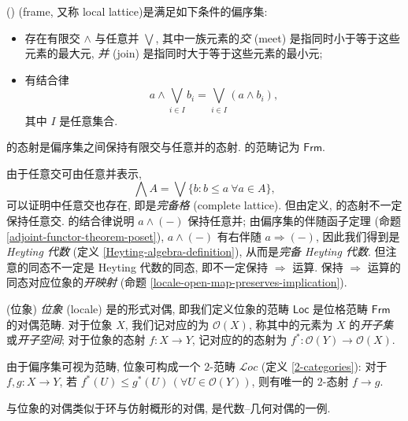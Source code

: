 \begin{definition}
	[label={frame-definition}]
	{(\fm{})}
	\emph{\fm{}} (frame, 又称 local lattice)\footnotemark 是满足如下条件的偏序集:
	\begin{itemize}
		\item 存在有限交 $\wedge$ 与任意并 $\bigvee$, 其中一族元素的\emph{交} (meet) 是指同时小于等于这些元素的最大元, \emph{并} (join) 是指同时大于等于这些元素的最小元;
		\item 有结合律
		$$
		a \wedge \bigvee_{i \in I} b_i = \bigvee_{i \in I} (a \wedge b_i),
		$$
		其中 $I$ 是任意集合.
	\end{itemize}
	
	\fm{}的态射是偏序集之间保持有限交与任意并的态射. \fm{}的范畴记为 $\mathsf {Frm}$.
\end{definition}
\begin{remark}
	[label={arbitrary-meet}]
	{}
	由于任意交可由任意并表示,
	$$
	\bigwedge A = \bigvee \big\{ b \colon b\leq a \ \forall a\in A\big\},
	$$
	可以证明\fm{}中任意交也存在, 即\fm{}是\emph{完备格} (complete lattice). 但由定义, \fm{}的态射不一定保持任意交.
	\fm{}的结合律说明 $a\wedge({-})$ 保持任意并; 由偏序集的伴随函子定理 (命题 \ref{adjoint-functor-theorem-poset}),
	$a\wedge({-})$ 有右伴随 $a\Rightarrow ({-})$, 因此我们得到\fm{}是\emph{Heyting 代数} (定义 \ref{Heyting-algebra-definition}), 从而是\emph{完备 Heyting 代数}. 但注意\fm{}的同态不一定是 Heyting 代数的同态, 即不一定保持 $\Rightarrow$ 运算. 保持 $\Rightarrow$ 运算的\fm{}同态对应位象的\emph{开映射} (命题 \ref{locale-open-map-preserves-implication}).
\end{remark}

\begin{definition}
	[label={locale-definition}]
	{(位象)}
	\emph{位象} (locale) 是\fm{}的形式对偶,
	即我们定义位象的范畴 $\mathsf {Loc}$ 是位格范畴 $\mathsf {Frm}$ 的对偶范畴.
	对于位象 $X$, 我们记对应的\fm{}为 $\mathcal O(X)$, 称其中的元素为 $X$ 的\emph{开子集}或\emph{开子空间}; 对于位象的态射 $f \colon X \to Y$,
	记对应的\fm{}的态射为 $f^* \colon \mathcal O(Y) \to \mathcal O(X)$.
	
	由于偏序集可视为范畴, 位象可构成一个 $2$-范畴 $\mathcal Loc$ (定义 \ref{2-categories}): 对于 $f,g\colon X\to Y$, 若 $f^*(U)\leq g^*(U)\,(\forall U\in\mathcal O(Y))$, 则有唯一的 $2$-态射 $f\to g$.
\end{definition}

\begin{remark}
	{}
	\fm{}与位象的对偶类似于环与仿射概形的对偶,
	是代数--几何对偶的一例.
\end{remark}

